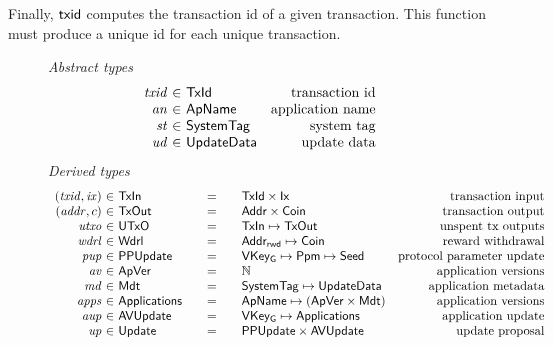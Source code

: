 Finally, $\mathsf{txid}$ computes the transaction id of a given transaction.
This function must produce a unique id for each unique transaction.

\begin{figure*}[htb]
  \emph{Abstract types}
  \begin{equation*}
    \begin{array}{r@{~\in~}lr}
      \var{txid} & \TxId & \text{transaction id}\\
      \var{an} & \ApName & \text{application name}\\
      \var{st} & \SystemTag & \text{system tag}\\
      \var{ud} & \UpdateData & \text{update data}\\
    \end{array}
  \end{equation*}
  \emph{Derived types}
  \begin{equation*}
    \begin{array}{r@{~\in~}l@{\qquad=\qquad}lr}
      (\var{txid}, \var{ix})
      & \TxIn
      & \TxId \times \Ix
      & \text{transaction input}
      \\
      (\var{addr}, c)
      & \type{TxOut}
      & \Addr \times \Coin
      & \text{transaction output}
      \\
      \var{utxo}
      & \UTxO
      & \TxIn \mapsto \TxOut
      & \text{unspent tx outputs}
      \\
      \var{wdrl}
      & \Wdrl
      & \AddrRWD \mapsto \Coin
      & \text{reward withdrawal}
      \\
      \var{pup}
      & \PPUpdate
      & \VKeyGen \mapsto \Ppm \mapsto \Seed
      & \text{protocol parameter update}
      \\
      \var{av}
      & \ApVer
      & \N
      & \text{application versions}
      \\
      \var{md}
      & \Metadata
      & \SystemTag\mapsto\UpdateData
      & \text{application metadata}
      \\
      \var{apps}
      & \Applications
      & \ApName \mapsto (\ApVer \times \Metadata)
      & \text{application versions}
      \\
      \var{aup}
      & \AVUpdate
      & \VKeyGen \mapsto \Applications
      & \text{application update}
      \\
      \var{up}
      & \Update
      & \PPUpdate \times \AVUpdate
      & \text{update proposal}
    \end{array}
  \end{equation*}

\end{figure*}
